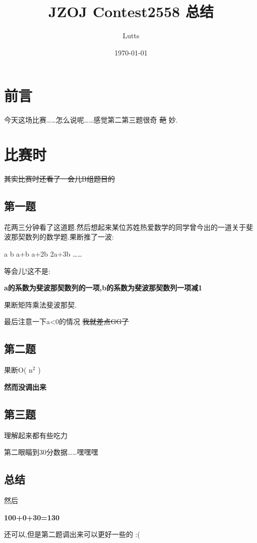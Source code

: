 \documentclass[11pt]{article}
\author{Lutts}
\date{\today}
\title{JZOJ Contest2558 总结}
\begin{document}
\maketitle
\tableofcontents


\section{前言}
\label{sec:org6e3370a}
今天这场比赛\ldots{}\ldots{}怎么说呢\ldots{}\ldots{}感觉第二第三题很奇 \sout{葩} 妙.

\section{比赛时}
\label{sec:org3bd9567}
\sout{其实比赛时还看了一会儿B组题目的}

\subsection{第一题}
\label{sec:orga9606f2}
花两三分钟看了这道题.然后想起来某位苏姓热爱数学的同学曾今出的一道关于斐波那契数列的数学题.果断推了一波:

a b a+b a+2b 2a+3b \ldots{}\ldots{}

等会儿!这不是:

\textbf{a的系数为斐波那契数列的一项,b的系数为斐波那契数列一项减1}

果断矩阵乘法斐波那契.

最后注意一下a<0的情况 \sout{我就差点GG了}

\subsection{第二题}
\label{sec:org7c9f483}
果断O( n\(^{\text{2}}\) )

\textbf{然而没调出来}

\subsection{第三题}
\label{sec:org92ecfa2}
理解起来都有些吃力

第二眼瞄到30分数据\ldots{}\ldots{}嘿嘿嘿

\subsection{总结}
\label{sec:orgbf5c01f}
然后

\textbf{100+0+30=130}

还可以,但是第二题调出来可以更好一些的 :(
\end{document}
